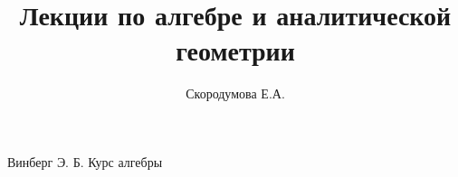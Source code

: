 \documentclass[a4paper]{article}
\title{Лекции по алгебре и аналитической геометрии}
\author{Скородумова Е.А.}
\begin{document}
\maketitle
\tableofcontents
\newpage






\begin{thebibliography}{}
Винберг Э. Б. Курс алгебры

\end{thebibliography}
\end{document}
